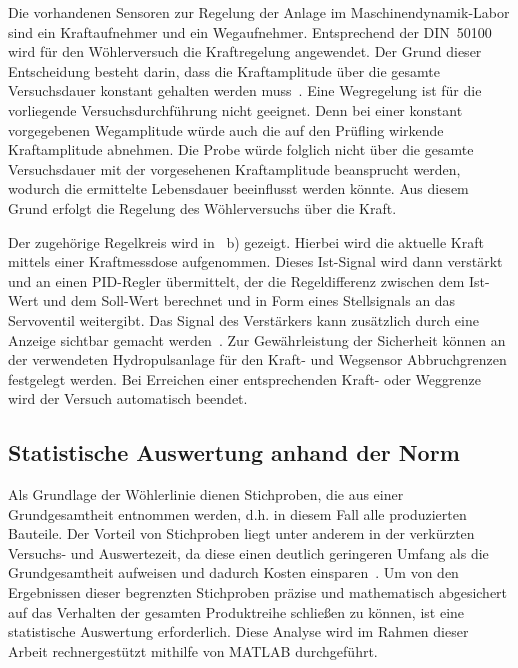 Die vorhandenen Sensoren zur Regelung der Anlage im Maschinendynamik-Labor sind ein Kraftaufnehmer und ein Wegaufnehmer. Entsprechend der DIN~50100 wird für den Wöhlerversuch die Kraftregelung angewendet.
Der Grund dieser Entscheidung besteht darin, dass die Kraftamplitude über die gesamte Versuchsdauer konstant gehalten werden muss~\cite[Seite~9]{DIN50100}. Eine Wegregelung ist für die vorliegende Versuchsdurchführung nicht geeignet. 
Denn bei einer konstant vorgegebenen Wegamplitude würde auch die auf den 
Prüfling wirkende Kraftamplitude abnehmen. Die Probe würde folglich nicht über 
die gesamte Versuchsdauer mit der vorgesehenen Kraftamplitude beansprucht werden, 
wodurch die ermittelte Lebensdauer beeinflusst werden könnte. Aus diesem Grund 
erfolgt die Regelung des Wöhlerversuchs über die Kraft. 

Der zugehörige Regelkreis wird in ~b) gezeigt. Hierbei wird die aktuelle Kraft mittels einer Kraftmessdose aufgenommen. Dieses Ist-Signal wird dann verstärkt und an einen PID-Regler übermittelt, der die Regeldifferenz zwischen dem Ist-Wert und dem Soll-Wert berechnet und in Form eines Stellsignals an das Servoventil weitergibt. Das Signal des Verstärkers kann zusätzlich durch eine Anzeige sichtbar gemacht werden~\cite[Seite~262]{Ölhydraulik2020}. Zur Gewährleistung der Sicherheit können an der verwendeten Hydropulsanlage für den Kraft- und Wegsensor Abbruchgrenzen festgelegt werden. Bei Erreichen einer entsprechenden Kraft- oder Weggrenze wird der Versuch automatisch beendet.

	\subsection{Statistische Auswertung anhand der Norm}
	Als Grundlage der Wöhlerlinie dienen Stichproben, die aus einer Grundgesamtheit entnommen werden, d.h. in diesem Fall alle produzierten Bauteile. Der Vorteil von Stichproben liegt unter anderem in der verkürzten Versuchs- und Auswertezeit, da diese einen deutlich geringeren Umfang als die Grundgesamtheit aufweisen und dadurch Kosten einsparen~\cite[Seite~20--21]{StatHedderich2020}. Um von den Ergebnissen dieser begrenzten Stichproben präzise und mathematisch abgesichert auf das Verhalten der gesamten Produktreihe schließen zu können, ist eine statistische Auswertung erforderlich. Diese Analyse wird im Rahmen dieser Arbeit rechnergestützt mithilfe von MATLAB durchgeführt.

